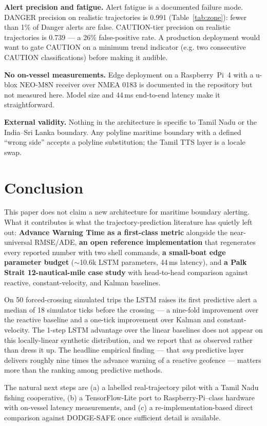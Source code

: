 \documentclass[conference]{IEEEtran}
\begin{document}
\textbf{Alert precision and fatigue.} Alert fatigue is a documented failure mode. DANGER precision on realistic trajectories is 0.991 (Table~\ref{tab:zone}): fewer than 1\% of Danger alerts are false. CAUTION-tier precision on realistic trajectories is 0.739 --- a 26\% false-positive rate. A production deployment would want to gate CAUTION on a minimum trend indicator (e.g. two consecutive CAUTION classifications) before making it audible.

\textbf{No on-vessel measurements.} Edge deployment on a Raspberry~Pi~4 with a u-blox NEO-M8N receiver over NMEA 0183 is documented in the repository but not measured here. Model size and 44\,ms end-to-end latency make it straightforward.

\textbf{External validity.} Nothing in the architecture is specific to Tamil Nadu or the India--Sri Lanka boundary. Any polyline maritime boundary with a defined ``wrong side'' accepts a polyline substitution; the Tamil TTS layer is a locale swap.

\section{Conclusion}

This paper does not claim a new architecture for maritime boundary alerting. What it contributes is what the trajectory-prediction literature has quietly left out: \textbf{Advance Warning Time as a first-class metric} alongside the near-universal RMSE/ADE, \textbf{an open reference implementation} that regenerates every reported number with two shell commands, \textbf{a small-boat edge parameter budget} ($\sim$10.6k LSTM parameters, 44\,ms latency), and \textbf{a Palk Strait 12-nautical-mile case study} with head-to-head comparison against reactive, constant-velocity, and Kalman baselines.

On 50 forced-crossing simulated trips the LSTM raises its first predictive alert a median of 18 simulator ticks before the crossing --- a nine-fold improvement over the reactive baseline and a one-tick improvement over Kalman and constant-velocity. The 1-step LSTM advantage over the linear baselines does not appear on this locally-linear synthetic distribution, and we report that as observed rather than dress it up. The headline empirical finding --- that \emph{any} predictive layer delivers roughly nine times the advance warning of a reactive geofence --- matters more than the ranking among predictive methods.

The natural next steps are (a) a labelled real-trajectory pilot with a Tamil Nadu fishing cooperative, (b) a TensorFlow-Lite port to Raspberry-Pi--class hardware with on-vessel latency measurements, and (c) a re-implementation-based direct comparison against DODGE-SAFE once sufficient detail is available.
\end{document}
